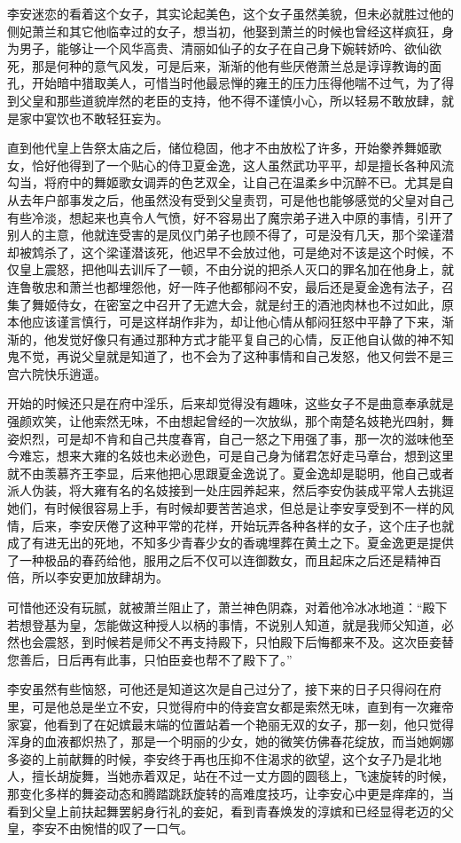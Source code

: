 李安迷恋的看着这个女子，其实论起美色，这个女子虽然美貌，但未必就胜过他的侧妃萧兰和其它他临幸过的女子，想当初，他娶到萧兰的时候也曾经这样疯狂，身为男子，能够让一个风华高贵、清丽如仙子的女子在自己身下婉转娇吟、欲仙欲死，那是何种的意气风发，可是后来，渐渐的他有些厌倦萧兰总是谆谆教诲的面孔，开始暗中猎取美人，可惜当时他最忌惮的雍王的压力压得他喘不过气，为了得到父皇和那些道貌岸然的老臣的支持，他不得不谨慎小心，所以轻易不敢放肆，就是家中宴饮也不敢轻狂妄为。

直到他代皇上告祭太庙之后，储位稳固，他才不由放松了许多，开始豢养舞姬歌女，恰好他得到了一个贴心的侍卫夏金逸，这人虽然武功平平，却是擅长各种风流勾当，将府中的舞姬歌女调弄的色艺双全，让自己在温柔乡中沉醉不已。尤其是自从去年户部事发之后，他虽然没有受到父皇责罚，可是他也能够感觉的父皇对自己有些冷淡，想起来也真令人气愤，好不容易出了魔宗弟子进入中原的事情，引开了别人的主意，他就连受害的是凤仪门弟子也顾不得了，可是没有几天，那个梁谨潜却被鸩杀了，这个梁谨潜该死，他迟早不会放过他，可是绝对不该是这个时候，不仅皇上震怒，把他叫去训斥了一顿，不由分说的把杀人灭口的罪名加在他身上，就连鲁敬忠和萧兰也都埋怨他，好一阵子他都郁闷不安，最后还是夏金逸有法子，召集了舞姬侍女，在密室之中召开了无遮大会，就是纣王的酒池肉林也不过如此，原本他应该谨言慎行，可是这样胡作非为，却让他心情从郁闷狂怒中平静了下来，渐渐的，他发觉好像只有通过那种方式才能平复自己的心情，反正他自认做的神不知鬼不觉，再说父皇就是知道了，也不会为了这种事情和自己发怒，他又何尝不是三宫六院快乐逍遥。

开始的时候还只是在府中淫乐，后来却觉得没有趣味，这些女子不是曲意奉承就是强颜欢笑，让他索然无味，不由想起曾经的一次放纵，那个南楚名妓艳光四射，舞姿炽烈，可是却不肯和自己共度春宵，自己一怒之下用强了事，那一次的滋味他至今难忘，想来大雍的名妓也未必逊色，可是自己身为储君怎好走马章台，想到这里就不由羡慕齐王李显，后来他把心思跟夏金逸说了。夏金逸却是聪明，他自己或者派人伪装，将大雍有名的名妓接到一处庄园养起来，然后李安伪装成平常人去挑逗她们，有时候很容易上手，有时候却要苦苦追求，但总是让李安享受到不一样的风情，后来，李安厌倦了这种平常的花样，开始玩弄各种各样的女子，这个庄子也就成了有进无出的死地，不知多少青春少女的香魂埋葬在黄土之下。夏金逸更是提供了一种极品的春药给他，服用之后不仅可以连御数女，而且起床之后还是精神百倍，所以李安更加放肆胡为。

可惜他还没有玩腻，就被萧兰阻止了，萧兰神色阴森，对着他冷冰冰地道：“殿下若想登基为皇，怎能做这种授人以柄的事情，不说别人知道，就是我师父知道，必然也会震怒，到时候若是师父不再支持殿下，只怕殿下后悔都来不及。这次臣妾替您善后，日后再有此事，只怕臣妾也帮不了殿下了。”

李安虽然有些恼怒，可他还是知道这次是自己过分了，接下来的日子只得闷在府里，可是他总是坐立不安，只觉得府中的侍妾宫女都是索然无味，直到有一次雍帝家宴，他看到了在妃嫔最末端的位置站着一个艳丽无双的女子，那一刻，他只觉得浑身的血液都炽热了，那是一个明丽的少女，她的微笑仿佛春花绽放，而当她婀娜多姿的上前献舞的时候，李安终于再也压抑不住渴求的欲望，这个女子乃是北地人，擅长胡旋舞，当她赤着双足，站在不过一丈方圆的圆毯上，飞速旋转的时候，那变化多样的舞姿动态和腾踏跳跃旋转的高难度技巧，让李安心中更是痒痒的，当看到父皇上前扶起舞罢躬身行礼的妾妃，看到青春焕发的淳嫔和已经显得老迈的父皇，李安不由惋惜的叹了一口气。

